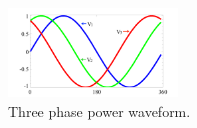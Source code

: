 \begin{figure}[h]
\centering
\includegraphics[width=0.4\textwidth]{figs/draw3phase.pdf}
\caption{Three phase power waveform.}
\label{fig_threephase}
\end{figure}
